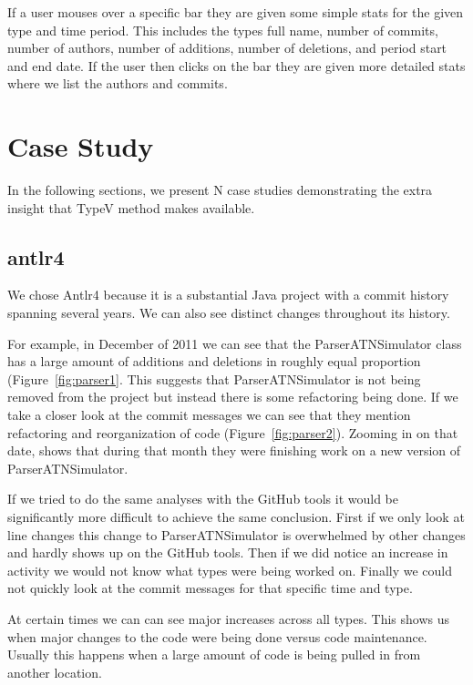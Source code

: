 \documentclass[conference]{IEEEtran}
\begin{document}
If a user mouses over a specific bar they are given some simple stats for the given type and time period. This includes the types full name, number of commits, number of authors, number of additions, number of deletions, and period start and end date. If the user then clicks on the bar they are given more detailed stats where we list the authors and commits.

\section{Case Study}

In the following sections, we present {N} case studies demonstrating the extra insight that TypeV method makes available. 

\subsection{antlr4}

We chose Antlr4 because it is a substantial Java project with a commit history spanning several years. We can also see distinct changes throughout its history.

For example, in December of 2011 we can see that the ParserATNSimulator class has a large amount of additions and deletions in roughly equal proportion (Figure~\ref{fig:parser1}. This suggests that ParserATNSimulator is not being removed from the project but instead there is some refactoring being done. If we take a closer look at the commit messages we can see that they mention refactoring and reorganization of code (Figure~\ref{fig:parser2}). Zooming in on that date,  shows that during that month they were finishing work on a new version of ParserATNSimulator. 

If we tried to do the same analyses with the GitHub tools it would be significantly more difficult to achieve the same conclusion. First if we only look at line changes this change to ParserATNSimulator is overwhelmed by other changes and hardly shows up on the GitHub tools. Then if we did notice an increase in activity we would not know what types were being worked on. Finally we could not quickly look at the commit messages for that specific time and type.

At certain times we can can see major increases across all types. This shows us when major changes to the code were being done versus code maintenance. Usually this happens when a large amount of code is being pulled in from another location.
\end{document}
